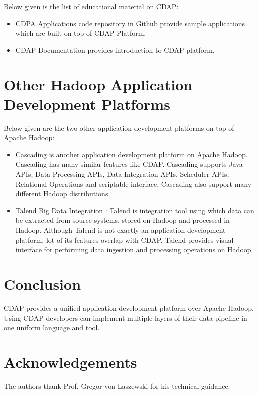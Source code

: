 \documentclass[9pt,twocolumn,twoside]{styles/osajnl}
\begin{document}
Below given is the list of educational material on CDAP:
\begin{itemize}
\item CDPA Applications code repository in Github \cite{github-cdap-apps}
provide sample applications which are built on top of CDAP Platform.
\item CDAP Documentation \cite{www-cdap-getting-started} provides introduction
 to CDAP platform.
\end{itemize}

\section{Other Hadoop Application Development Platforms}
Below given are the two other application development platforms on top of
Apache Hadoop:
\begin{itemize}
\item Cascading \cite{www-cascading} is another application development
platform on Apache Hadoop. Cascading has many similar features like CDAP.
Cascading supports Java APIs, Data Processing APIs, Data Integration APIs,
Scheduler APIs, Relational Operations and scriptable interface. Cascading
also support many different Hadoop distributions.

\item Talend Big Data Integration \cite{www-talend} : Talend is integration
tool using which data can be extracted from source systems, stored on Hadoop
and processed in Hadoop. Although Talend is not exactly an application
development platform, lot of its features overlap with CDAP. Talend provides
visual interface for performing data ingestion and processing operations on
Hadoop
\end{itemize}

\section{Conclusion}
CDAP provides a unified application development platform over Apache Hadoop.
Using CDAP developers can implement multiple layers of their data pipeline in
 one uniform language and tool.

\section*{Acknowledgements}

The authors thank Prof. Gregor von Laszewski for his technical guidance.




\end{document}

